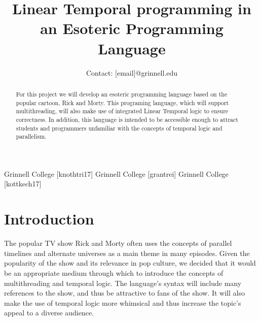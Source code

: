 \documentclass[numbers]{sigplanconf}
\begin{document}
\setlength{\pdfpageheight}{\paperheight}
\setlength{\pdfpagewidth}{\paperwidth}



\titlebanner{}        %
\preprintfooter{}   %

\title{Linear Temporal programming in an Esoteric Programming Language}
\subtitle{Contact: [email]@grinnell.edu}


           {Grinnell College}
           {[knothtri17]}
           {Grinnell College}
           {[grantrei]}
           {Grinnell College}
           {[kottkech17]}

\makeatletter
\def\@copyrightspace{\relax}
\makeatother
%

\maketitle

\begin{abstract}
For this project we will develop an esoteric programming language
based on the popular cartoon, Rick and Morty. This programing
language, which will support multithreading, will also make use of integrated Linear Temporal logic to ensure
correctness. In addition, this language
is intended to be accessible enough to attract students and
programmers unfamiliar with the concepts of temporal logic and parallelism.
\end{abstract}



\section{Introduction}
The popular TV show Rick and Morty often uses the concepts of
parallel timelines and alternate universes as a main theme in many
episodes. Given the popularity of the show and its relevance in pop
culture, we decided that it would be an appropriate medium through
which to introduce the concepts of multithreading and temporal logic.
The language's syntax will include many references to the show,
and thus be attractive to fans of the show. It will also make the use of
temporal logic more whimsical and thus increase the topic's appeal to a diverse audience.
\end{document}
